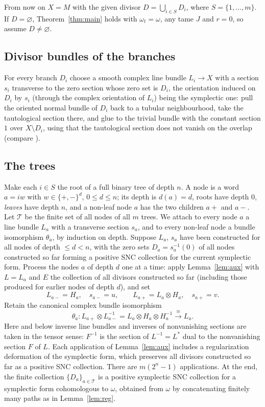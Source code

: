 \documentclass[11pt]{article}
\theoremstyle{remark}
\newcommand{\cT}{\mathcal T}
\begin{document}
From now on $X=M$ with the given divisor $D=\bigcup_{i\in S}D_i$, where
$S=\{1,\dots,m\}$. If $D=\varnothing$, Theorem~\ref{thm:main} holds
with $\omega_t=\omega$, any tame $J$ and $r=0$, so assume $D\ne\varnothing$.

\subsection*{Divisor bundles of the branches}
For every branch $D_i$ choose a smooth complex line bundle $L_i\to X$
with a section $s_i$ transverse to the zero section whose zero set is
$D_i$, the orientation induced on $D_i$ by $s_i$ (through the complex
orientation of $L_i$) being the symplectic one: pull the oriented
normal bundle of $D_i$ back to a tubular neighbourhood, take the
tautological section there, and glue to the trivial bundle with the
constant section $1$ over $X\setminus D_i$, using that the tautological
section does not vanish on the overlap (compare \cite[Section 2.2]{FMZS}).

\subsection*{The trees}
Make each $i\in S$ the root of a full binary tree of depth $n$. A node
is a word $a=iw$ with $w\in\{+,-\}^{d}$, $0\le d\le n$; its depth is
$d(a)=d$, roots have depth $0$, \emph{leaves} have depth $n$, and a
non-leaf node $a$ has the two children $a+$ and $a-$. Let $\cT$ be the
finite set of all nodes of all $m$ trees. We attach to every node $a$ a
line bundle $L_a$ with a transverse section $s_a$, and to every non-leaf
node a bundle isomorphism $\theta_a$, by induction on depth.
Suppose $L_a$, $s_a$ have been constructed for all nodes of depth
$\le d<n$, with the zero sets $D_a=s_a^{-1}(0)$ of all nodes constructed
so far forming a positive SNC collection for the current symplectic
form. Process the nodes $a$ of depth $d$ one at a time: apply
Lemma~\ref{lem:aux} with $L=L_a$ and $E$ the collection of all
divisors constructed so far (including those produced for earlier nodes
of depth $d$), and set
\[
 L_{a-}=H_a,\quad s_{a-}=u,\qquad
 L_{a+}=L_a\otimes H_a,\quad s_{a+}=v .
\]
Retain the canonical complex bundle isomorphism
\begin{equation}\label{eq:theta}
 \theta_a\colon L_{a+}\otimes L_{a-}^{-1}
 =L_a\otimes H_a\otimes H_a^{-1}\xrightarrow{\ \cong\ }L_a .
\end{equation}
Here and below inverse line bundles and inverses of nonvanishing
sections are taken in the tensor sense: $F^{-1}$ is the section of
$L^{-1}=L^*$ dual to the nonvanishing section $F$ of $L$. Each
application of Lemma~\ref{lem:aux} includes a regularization
deformation of the symplectic form, which preserves all divisors
constructed so far as a positive SNC collection. There are
$m(2^n-1)$ applications. At the end, the finite collection
$\{D_a\}_{a\in\cT}$ is a positive symplectic SNC collection for a
symplectic form cohomologous to $\omega$, obtained from $\omega$ by
concatenating finitely many paths as in Lemma~\ref{lem:reg}.
\end{document}
